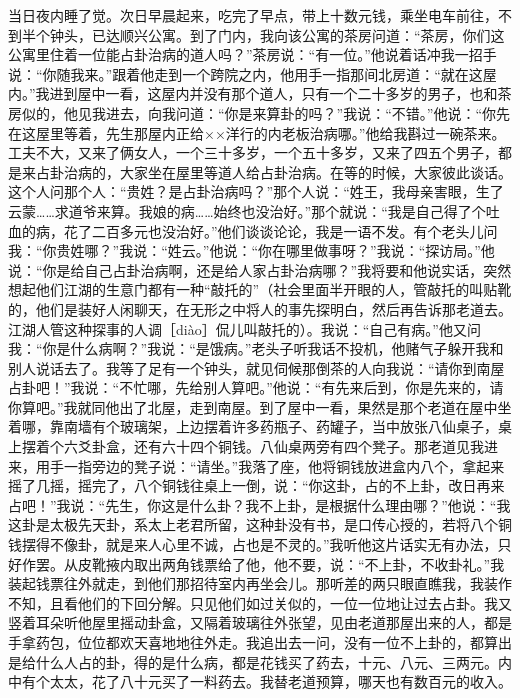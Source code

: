 \documentclass[12pt,UTF8]{ctexbook}
\begin{document}
当日夜内睡了觉。次日早晨起来，吃完了早点，带上十数元钱，乘坐电车前往，不到半个钟头，已达顺兴公寓。到了门内，我向该公寓的茶房问道：“茶房，你们这公寓里住着一位能占卦治病的道人吗？”茶房说：“有一位。”他说着话冲我一招手说：“你随我来。”跟着他走到一个跨院之内，他用手一指那间北房道：“就在这屋内。”我进到屋中一看，这屋内并没有那个道人，只有一个二十多岁的男子，也和茶房似的，他见我进去，向我问道：“你是来算卦的吗？”我说：“不错。”他说：“你先在这屋里等着，先生那屋内正给××洋行的内老板治病哪。”他给我斟过一碗茶来。工夫不大，又来了俩女人，一个三十多岁，一个五十多岁，又来了四五个男子，都是来占卦治病的，大家坐在屋里等道人给占卦治病。在等的时候，大家彼此谈话。这个人问那个人：“贵姓？是占卦治病吗？”那个人说：“姓王，我母亲害眼，生了云蒙……求道爷来算。我娘的病……始终也没治好。”那个就说：“我是自己得了个吐血的病，花了二百多元也没治好。”他们谈谈论论，我是一语不发。有个老头儿问我：“你贵姓哪？”我说：“姓云。”他说：“你在哪里做事呀？”我说：“探访局。”他说：“你是给自己占卦治病啊，还是给人家占卦治病哪？”我将要和他说实话，突然想起他们江湖的生意门都有一种“敲托的”（社会里面半开眼的人，管敲托的叫贴靴的，他们是装好人闲聊天，在无形之中将人的事先探明白，然后再告诉那老道去。江湖人管这种探事的人调［diào］侃儿叫敲托的）。我说：“自己有病。”他又问我：“你是什么病啊？”我说：“是饿病。”老头子听我话不投机，他赌气子躲开我和别人说话去了。我等了足有一个钟头，就见伺候那倒茶的人向我说：“请你到南屋占卦吧！”我说：“不忙哪，先给别人算吧。”他说：“有先来后到，你是先来的，请你算吧。”我就同他出了北屋，走到南屋。到了屋中一看，果然是那个老道在屋中坐着哪，靠南墙有个玻璃架，上边摆着许多药瓶子、药罐子，当中放张八仙桌子，桌上摆着个六爻卦盒，还有六十四个铜钱。八仙桌两旁有四个凳子。那老道见我进来，用手一指旁边的凳子说：“请坐。”我落了座，他将铜钱放进盒内八个，拿起来摇了几摇，摇完了，八个铜钱往桌上一倒，说：“你这卦，占的不上卦，改日再来占吧！”我说：“先生，你这是什么卦？我不上卦，是根据什么理由哪？”他说：“我这卦是太极先天卦，系太上老君所留，这种卦没有书，是口传心授的，若将八个铜钱摆得不像卦，就是来人心里不诚，占也是不灵的。”我听他这片话实无有办法，只好作罢。从皮靴掖内取出两角钱票给了他，他不要，说：“不上卦，不收卦礼。”我装起钱票往外就走，到他们那招待室内再坐会儿。那听差的两只眼直瞧我，我装作不知，且看他们的下回分解。只见他们如过关似的，一位一位地让过去占卦。我又竖着耳朵听他屋里摇动卦盒，又隔着玻璃往外张望，见由老道那屋出来的人，都是手拿药包，位位都欢天喜地地往外走。我追出去一问，没有一位不上卦的，都算出是给什么人占的卦，得的是什么病，都是花钱买了药去，十元、八元、三两元。内中有个太太，花了八十元买了一料药去。我替老道预算，哪天也有数百元的收入。
\end{document}
